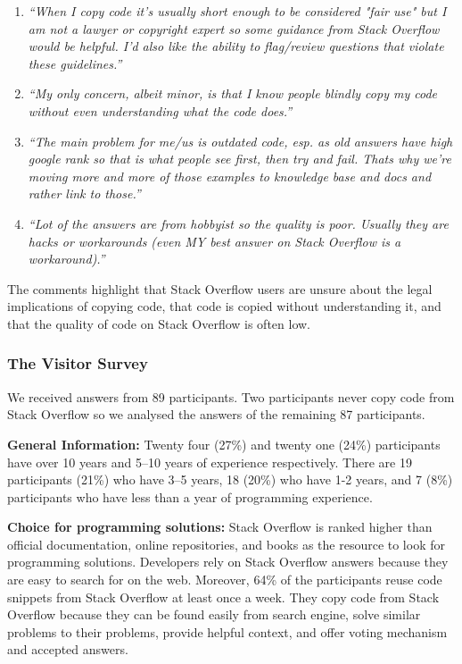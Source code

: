 \documentclass[10pt,journal,compsoc]{IEEEtran}
\begin{document}
\begin{enumerate}
	\item \textit{``When I copy code it's usually short enough to be considered "fair
		use" but I am not a lawyer or copyright expert so some guidance from Stack Overflow would be
		helpful. I'd also like the ability to flag/review questions that violate these
		guidelines.''}
	\item \textit{``My only concern, albeit minor, is that I know people blindly copy
		my code without even understanding what the code does.''}
	\item \textit{``The main problem for me/us is outdated code, esp. as old answers
		have high google rank so that is what people see first, then try and fail. Thats
		why we're moving more and more of those examples to knowledge base and docs and
		rather link to those.''}
	\item \textit{``Lot of the answers are from hobbyist so the quality is poor.
		Usually they are hacks or workarounds (even MY best answer on Stack Overflow is a
		workaround).''}
\end{enumerate}

The comments highlight that Stack Overflow users are unsure about the
legal implications of copying code, that code is copied without
understanding it, and that the quality of code on Stack Overflow is
often low.

\subsubsection{The Visitor Survey}

We received answers from 89 participants. 
Two participants never
copy code from Stack Overflow so we analysed the answers of the remaining 87
participants.

\textbf{General Information: }
Twenty four (27\%) and twenty one (24\%) participants have over 10 years and 5--10
years of experience respectively. There are 19 participants (21\%) who have 3--5
years, 18 (20\%) who have 1-2 years, and 7 (8\%) participants who have less than a
year of programming experience.

\textbf{Choice for programming solutions: }
Stack Overflow is ranked higher than official documentation, online
repositories, and books as the resource to look for programming solutions.
Developers rely on Stack Overflow answers because they are easy to search for on
the web. Moreover, 64\% of the participants reuse code snippets from Stack
Overflow at least once a week. They copy code from Stack Overflow because they
can be found easily from search engine, solve similar problems to their
problems, provide helpful context, and offer voting mechanism and accepted answers. 
\end{document}
